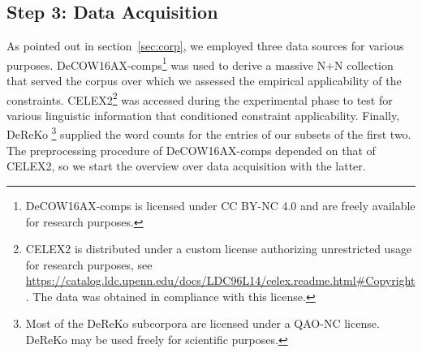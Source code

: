 \documentclass[10pt, a4paper]{article}
\begin{document}



\subsection{Step 3: Data Acquisition}
\label{sec:data}

As pointed out in section~\ref{sec:corp}, we employed three data sources for various purposes. DeCOW16AX-comps\footnote{DeCOW16AX-comps is licensed under CC BY-NC 4.0 and are freely available for research purposes.} was used to derive a massive N+N collection that served the corpus over which we assessed the empirical applicability of the constraints. CELEX2\footnote{CELEX2 is distributed under a custom license authorizing unrestricted usage for research purposes, see \url{https://catalog.ldc.upenn.edu/docs/LDC96L14/celex.readme.html\#Copyright}. The data was obtained in compliance with this license.} was accessed during the experimental phase to test for various linguistic information that conditioned constraint applicability. Finally, DeReKo \footnote{Most of the DeReKo subcorpora are licensed under a QAO-NC license. DeReKo may be used freely for scientific purposes.} supplied the word counts for the entries of our subsets of the first two. The preprocessing procedure of DeCOW16AX-comps depended on that of CELEX2, so we start the overview over data acquisition with the latter.
\end{document}
